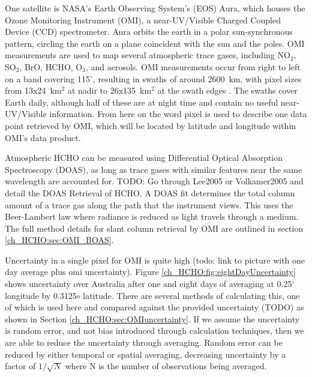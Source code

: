     One satellite is NASA's Earth Observing System's (EOS) Aura, which houses the Ozone Monitoring Instrument (OMI), a near-UV/Visible Charged Coupled Device (CCD) spectrometer.
    Aura orbits the earth in a polar sun-synchronous pattern, circling the earth on a plane coincident with the sun and the poles. 
    OMI measurements are used to map several atmospheric trace gases, including NO$_2$, SO$_2$, BrO, HCHO, O$_3$, and aerosols.
    OMI measurements occur from right to left on a band covering 115$^{\circ}$, resulting in swaths of around 2600~km, with pixel sizes from 13x24~km$^2$ at nadir to 26x135~km$^2$ at the swath edges \citep{Abad2015}.
    The swaths cover Earth daily, although half of these are at night time and contain no useful near-UV/Visible information.
    From here on the word pixel is used to describe one data point retrieved by OMI, which will be located by latitude and longitude within OMI's data product.
    
    Atmospheric HCHO can be measured using Differential Optical Absorption Spectroscopy (DOAS), as long as trace gases with similar features near the same wavelength are accounted for.
    TODO: Go through Lee2005 or Volkamer2005 and detail the DOAS Retrieval of HCHO.
    A DOAS fit determines the total column amount of a trace gas along the path that the instrument views.
    This uses the Beer-Lambert law where radiance is reduced as light travels through a medium.
    The full method details for slant column retrieval by OMI are outlined in section \ref{ch_HCHO:sec:OMI_BOAS}.
    
    Uncertainty in a single pixel for OMI is quite high (todo: link to picture with one day average plus omi uncertainty).
    Figure \ref{ch_HCHO:fig:eightDayUncertainty} shows uncertainty over Australia after one and eight days of averaging at 0.25$^{\circ}$ longitude by 0.3125${\circ}$ latitude.
    There are several methods of calculating this, one of which is used here and compared against the provided uncertainty (TODO) as shown in Section \ref{ch_HCHO:sec:OMIuncertainty}.
    If we assume the uncertainty is random error, and not bias introduced through calculation techniques, then we are able to reduce the uncertainty through averaging.
    Random error can be reduced by either temporal or spatial averaging, decreasing uncertainty by a factor of $1/\sqrt{N}$ where N is the number of observations being averaged.
    
